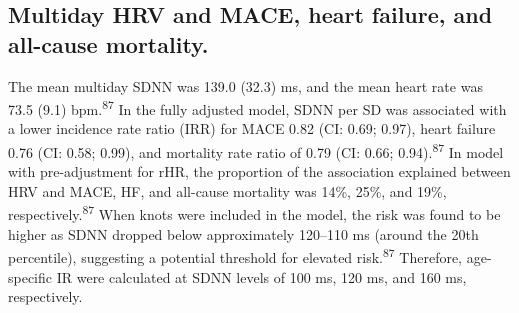 \documentclass[
  a4paper,
  headsepline=true,
  open=any]{scrbook}
\begin{document}
\restoregeometry

\hypertarget{multiday-hrv-and-mace-heart-failure-and-all-cause-mortality.}{%
\subsection{Multiday HRV and MACE, heart failure, and all-cause
mortality.}\label{multiday-hrv-and-mace-heart-failure-and-all-cause-mortality.}}

The mean multiday SDNN was 139.0 (32.3) ms, and the mean heart rate was
73.5 (9.1) bpm.\textsuperscript{87} In the fully adjusted model, SDNN
per SD was associated with a lower incidence rate ratio (IRR) for MACE
0.82 (CI: 0.69; 0.97), heart failure 0.76 (CI: 0.58; 0.99), and
mortality rate ratio of 0.79 (CI: 0.66; 0.94).\textsuperscript{87} In
model with pre-adjustment for rHR, the proportion of the association
explained between HRV and MACE, HF, and all-cause mortality was 14\%,
25\%, and 19\%, respectively.\textsuperscript{87} When knots were
included in the model, the risk was found to be higher as SDNN dropped
below approximately 120--110 ms (around the 20th percentile), suggesting
a potential threshold for elevated risk.\textsuperscript{87} Therefore,
age-specific IR were calculated at SDNN levels of 100 ms, 120 ms, and
160 ms, respectively.

\end{document}
